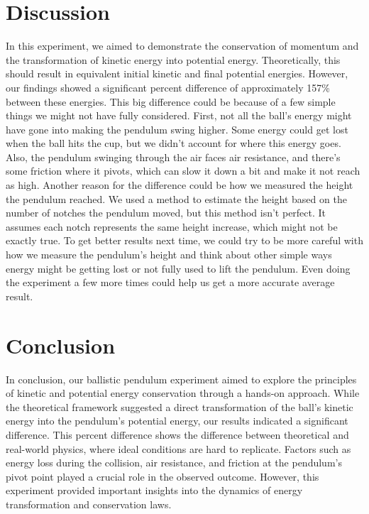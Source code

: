 \documentclass{report}
\begin{document}
    \bigbreak \noindent 
    \section{Discussion}
    \bigbreak \noindent 
    In this experiment, we aimed to demonstrate the conservation of momentum and the transformation of kinetic energy into potential energy. Theoretically, this should result in equivalent initial kinetic and final potential energies. However, our findings showed a significant percent difference of approximately 157\% between these energies. 
    \bigbreak \noindent 
    This big difference could be because of a few simple things we might not have fully considered. First, not all the ball's energy might have gone into making the pendulum swing higher. Some energy could get lost when the ball hits the cup, but we didn't account for where this energy goes. Also, the pendulum swinging through the air faces air resistance, and there's some friction where it pivots, which can slow it down a bit and make it not reach as high.
    \bigbreak \noindent 
    Another reason for the difference could be how we measured the height the pendulum reached. We used a method to estimate the height based on the number of notches the pendulum moved, but this method isn't perfect. It assumes each notch represents the same height increase, which might not be exactly true.
    \bigbreak \noindent 
    To get better results next time, we could try to be more careful with how we measure the pendulum's height and think about other simple ways energy might be getting lost or not fully used to lift the pendulum. Even doing the experiment a few more times could help us get a more accurate average result.

    \bigbreak \noindent 
    \section{Conclusion}
    \bigbreak \noindent 
    In conclusion, our ballistic pendulum experiment aimed to explore the principles of kinetic and potential energy conservation through a hands-on approach. While the theoretical framework suggested a direct transformation of the ball's kinetic energy into the pendulum's potential energy, our results indicated a significant difference. This percent difference shows the difference between theoretical and real-world physics, where ideal conditions are hard to replicate. Factors such as energy loss during the collision, air resistance, and friction at the pendulum's pivot point played a crucial role in the observed outcome. However, this experiment provided important insights into the dynamics of energy transformation and conservation laws.










    
\end{document}
